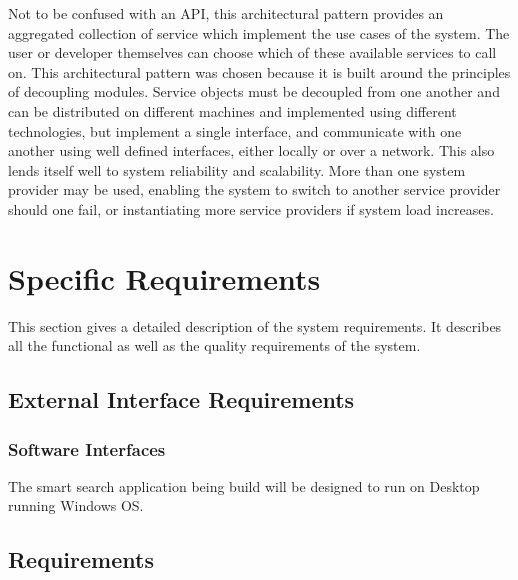 \documentclass[a4paper,10pt]{article}
\begin{document}
Not to be confused with an API, this architectural pattern provides an aggregated collection of service which implement the use cases of the system. The user or developer themselves can choose which of these available services to call on. This architectural pattern was chosen because it is built around the principles of decoupling modules. Service objects must be decoupled from one another and can be distributed on different machines and implemented using different technologies, but implement a single interface, and communicate with one another using well defined interfaces, either locally or over a network. This also lends itself well to system reliability and scalability. More than one system provider may be used, enabling the system to switch to another service provider should one fail, or instantiating more service providers if system load increases.

	
	\newpage
	\section{Specific Requirements}
This section gives a detailed description of the system requirements. It describes all the functional as well as the quality requirements of the system.

	\subsection{External Interface Requirements}

            \subsubsection{Software Interfaces}
The smart search application being build will be designed to run on Desktop running Windows OS.

	\subsection{Requirements}
\end{document}
